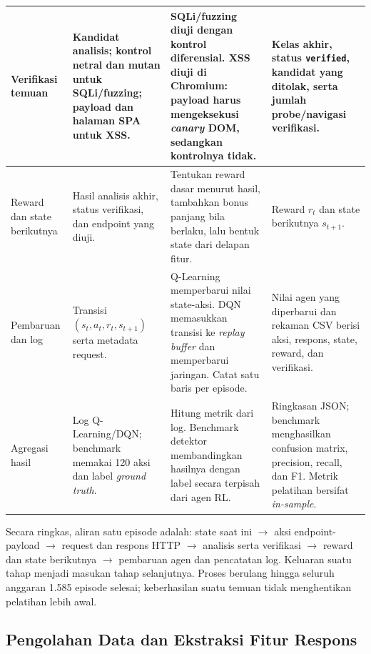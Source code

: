 \begin{table}[htbp]
\begin{tabularx}{\textwidth}{
>{\raggedright\arraybackslash}p{1.9cm}
>{\raggedright\arraybackslash}p{3.1cm}
>{\raggedright\arraybackslash}X
>{\raggedright\arraybackslash}p{2.6cm}}
\midrule
Verifikasi temuan & Kandidat analisis; kontrol netral dan mutan untuk SQLi/fuzzing; payload dan halaman SPA untuk XSS. & SQLi/fuzzing diuji dengan kontrol diferensial. XSS diuji di Chromium: payload harus mengeksekusi \textit{canary} DOM, sedangkan kontrolnya tidak. & Kelas akhir, status \texttt{verified}, kandidat yang ditolak, serta jumlah probe/navigasi verifikasi. \\
\midrule
Reward dan state berikutnya & Hasil analisis akhir, status verifikasi, dan endpoint yang diuji. & Tentukan reward dasar menurut hasil, tambahkan bonus panjang bila berlaku, lalu bentuk state dari delapan fitur. & Reward $r_t$ dan state berikutnya $s_{t+1}$. \\
\midrule
Pembaruan dan log & Transisi $(s_t,a_t,r_t,s_{t+1})$ serta metadata request. & Q-Learning memperbarui nilai state-aksi. DQN memasukkan transisi ke \textit{replay buffer} dan memperbarui jaringan. Catat satu baris per episode. & Nilai agen yang diperbarui dan rekaman CSV berisi aksi, respons, state, reward, dan verifikasi. \\
\midrule
Agregasi hasil & Log Q-Learning/DQN; benchmark memakai 120 aksi dan label \textit{ground truth}. & Hitung metrik dari log. Benchmark detektor membandingkan hasilnya dengan label secara terpisah dari agen RL. & Ringkasan JSON; benchmark menghasilkan confusion matrix, precision, recall, dan F1. Metrik pelatihan bersifat \textit{in-sample}. \\
\bottomrule
\end{tabularx}
\end{table}

Secara ringkas, aliran satu episode adalah: state saat ini $\rightarrow$ aksi endpoint-payload $\rightarrow$ request dan respons HTTP $\rightarrow$ analisis serta verifikasi $\rightarrow$ reward dan state berikutnya $\rightarrow$ pembaruan agen dan pencatatan log. Keluaran suatu tahap menjadi masukan tahap selanjutnya. Proses berulang hingga seluruh anggaran 1.585 episode selesai; keberhasilan suatu temuan tidak menghentikan pelatihan lebih awal.

\subsection{Pengolahan Data dan Ekstraksi Fitur Respons}

